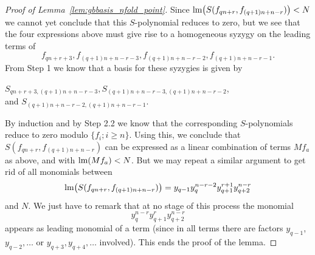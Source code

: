 \begin{proof}[Proof of Lemma~\ref{lem:gbbasis_nfold_point}]
Since $\textnormal{lm}\bigl(S(f_{qn+r},f_{(q+1)n+n-r})\bigr)< N$ we cannot yet conclude that this $S$-polynomi\-al reduces to zero, but we see that the four expressions above must give rise to a homogeneous syzygy on the leading terms of
\[ f_{qn+r+3},f_{(q+1)n+n-r-3},f_{(q+1)n+n-r-2},f_{(q+1)n+n-r-1}.\]
From Step 1 we know that a basis for these syzygies is given by 
\begin{center}
  $S_{qn+r+3,(q+1)n+n-r-3} , S_{(q+1)n+n-r-3,(q+1)n+n-r-2}$, \\
  and $S_{(q+1)n+n-r-2,(q+1)n+n-r-1}$.
 \end{center}
By induction and by Step 2.2 we know that the corresponding $S$-polynomials reduce to zero modulo $\{f_i;i\geq n\}$. Using this, we conclude that $S(f_{qn+r},f_{(q+1)n+n-r})$ can be expressed as a linear combination of terms $Mf_a$ as above, and with $\textnormal{lm}(Mf_a) < N$. But we may repeat a similar argument to get rid of all monomials between
\[ \textnormal{lm}\bigl(S(f_{qn+r},f_{(q+1)n+n-r})\bigr) = y_{q-1}y_q^{n-r-2}y_{q+1}^{r+1}y_{q+2}^{n-r} \]
and $N$. We just have to remark that at no stage of this process the monomial
\[   y_q^{n-r} y_{q+1}^{r} y_{q+2}^{n-r}  \] 
appears as leading monomial of a term (since in all terms there are factors $y_{q-1}$, $y_{q-2},\ldots$ or $y_{q+3},y_{q+4},\ldots$ involved). This ends the proof of the lemma.
\end{proof}

